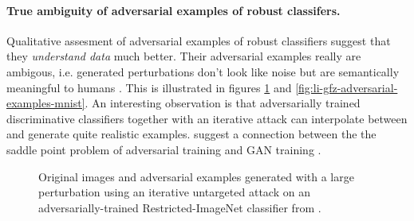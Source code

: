 \documentclass{article}
\begin{document}
\paragraph{True ambiguity of adversarial examples of robust classifers.}
Qualitative assesment of adversarial examples of robust classifiers suggest that they \textit{understand data} much better. Their adversarial examples really are ambigous, i.e. generated perturbations don't look like noise but are semantically meaningful to humans \citep{Tsipras:2018:RMBOA,Li:2019:AGCMRAA}.  This is illustrated in figures \ref{fig:tsipras-robust-adversarial-examples} and \ref{fig:li-gfz-adversarial-examples-mnist}. An interesting observation is that adversarially trained discriminative classifiers together with an iterative attack can interpolate between and generate quite realistic examples. \citet{Tsipras:2018:RMBOA} suggest a connection between the the saddle point problem of adversarial training and GAN training \citep{Goodfellow:2014:GAN}.

\begin{figure}
	\begin{center}
	\end{center}
	\caption{Original images and adversarial examples generated with a large perturbation using an iterative untargeted attack on an adversarially-trained Restricted-ImageNet \citep{Tsipras:2018:RMBOA} classifier from \citet{Tsipras:2018:RMBOA}.}
	\label{fig:tsipras-robust-adversarial-examples}
\end{figure}
\end{document}
